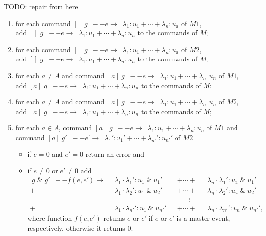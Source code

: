 \documentclass{article}
\newcommand{\arc}[1]{\;\;--{#1}\longrightarrow \;\;}
\renewcommand{\_}{\underline{~}}
\begin{document}
TODO: repair from here

\begin{enumerate}
	\item for each command $[] \; g \arc{e}   \lambda_1 : u_1 + \cdots + \lambda_n : u_n$ of $M1$, \\ 
	add	$[] \; g \arc{e}   \lambda_1 : u_1 + \cdots + \lambda_n : u_n$ to the commands of $M$;
	
	\item for each command $[] \; g \arc{e}   \lambda_1 : u_1 + \cdots + \lambda_n : u_n$ of $M2$, \\ 
	add	$[] \; g \arc{e}   \lambda_1 : u_1 + \cdots + \lambda_n : u_n$ to the commands of $M$;

	\item for each $a \neq A$ and command $[a] \; g \arc{e}   \lambda_1 : u_1 + \cdots + \lambda_n : u_n$ of $M1$, \\ 
	add	$[a] \; g \arc{e}   \lambda_1 : u_1 + \cdots + \lambda_n : u_n$ to the commands of $M$;

	\item for each $a \neq A$ and command $[a] \; g \arc{e}   \lambda_1 : u_1 + \cdots + \lambda_n : u_n$ of $M2$, \\ 
	add	$[a] \; g \arc{e}   \lambda_1 : u_1 + \cdots + \lambda_n : u_n$ to the commands of $M$;

	\item for each $a \in A$, command $[a] \; g \arc{e}   \lambda_1 : u_1 + \cdots + \lambda_n : u_n$ of $M1$ and command $[a] \; g' \arc{e'} \lambda_1' : u_1' + \cdots + \lambda_{n'}' : u_{n'}'$ of $M2$ 
	\begin{itemize}
		\item if $e = 0$ and $e' = 0$ return an error and
		\item if $e \neq 0$ or  $e' \neq 0$ add  
		\begin{align*}
			[a] \; g \; \& \; g' \arc{f(e,e')} &\lambda_1 \cdot \lambda_1' : u_1 \; \& \; u_1' & &+ \cdots + & &\lambda_n \cdot \lambda_1' : u_n \; \& \; u_1' \\
			+&\lambda_1 \cdot \lambda_2' : u_1 \; \& \; u_2' & &+ \cdots + & &\lambda_n \cdot \lambda_2' : u_n \; \& \; u_2' \\
			& &  & \quad \;\:\, \vdots \\
			+&\lambda_1 \cdot \lambda_{n'}' : u_1 \; \& \; u_{n'}' & &+ \cdots + & &\lambda_n \cdot \lambda_{n'}' : u_n \; \& \; u_{n'}',
		\end{align*}
		where function $f(e,e')$ returns $e$ or $e'$ if $e$ or $e'$ is a master event, respectively, otherwise it returns $0$.
	\end{itemize}%
\end{enumerate}
\end{document}
